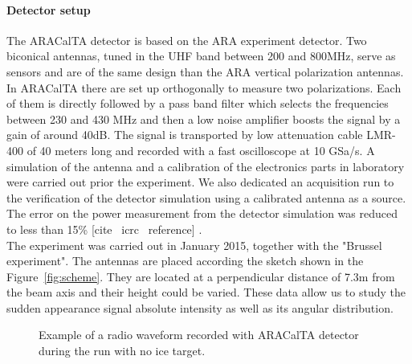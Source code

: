 \documentclass[12pt]{article}
\begin{document}
\paragraph{Detector setup}
The ARACalTA detector is based on the ARA experiment detector. Two biconical antennas, tuned in the UHF band between 200 and 800MHz, serve as sensors and are of the same design than the ARA vertical polarization antennas. In ARACalTA there are set up orthogonally to measure two polarizations. Each of them is directly followed by a pass band filter which selects the frequencies between 230 and  430 MHz and then a low noise amplifier boosts the signal by a gain of around 40dB.  The signal is transported by low attenuation cable LMR-400 of 40 meters long and recorded with a fast oscilloscope at 10 GSa/s. A simulation of the antenna and a calibration of the electronics parts in laboratory were carried out prior the experiment. We also dedicated an acquisition run to the verification of the detector simulation using a calibrated antenna as a source. The error on the power measurement from the detector simulation was reduced to less than 15\% \color{red} [cite \ icrc \ reference] \color{black}. 
\\ The experiment was carried out in January 2015, together with the "Brussel experiment". The antennas are placed according the sketch shown in the Figure~\ref{fig:scheme}. They are located at a perpendicular distance of 7.3m from the beam axis and their height could be varied. These data allow us to study the sudden appearance signal absolute intensity as well as its angular distribution.

\begin{figure}[!h]
  \centering
  \hspace*{-3ex}
  \caption{Example of a radio waveform recorded with ARACalTA detector during the run with no ice target.}
  \label{fig:waveform}
\end{figure}
\end{document}
